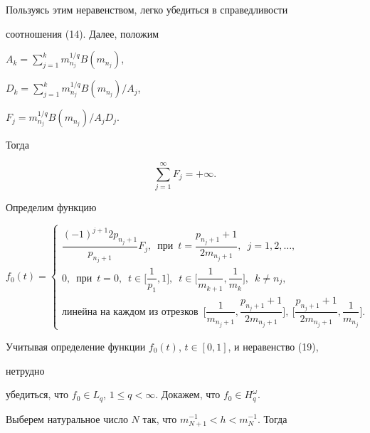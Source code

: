 \begin{pf}
\begin{equation}
\end{equation} 


Пользуясь этим неравенством, легко убедиться в справедливости 


соотношения (14). Далее, положим 


$A_k=\sum\limits^k_{j=1}m^{1/q}_{n_j}B(m_{n_j})$, 


$D_k=\sum\limits^k_{j=1}m^{1/q}_{n_j}B(m_{n_j})/A_j$, 


$F_j=m^{1/q}_{n_j}B(m_{n_j})/A_j D_j$. 


Тогда 


\begin{equation} 


\sum^\infty_{j=1}F_j=+\infty. 


\end{equation} 


 


Определим функцию 


$$ 


f_0(t)= 


\begin{cases} 


\dfrac{(-1)^{j+1}2p_{n_j+1}}{p_{n_j+1}}F_j,\ \; \text{при}\ \; 


t=\dfrac{p_{n_j+1}+1}{2m_{n_j+1}},\ \;j=1,2,\dotsc,\\ 


0,\ \; \text{при}\ \; t=0,\ \; t\in\Big[\dfrac{1}{p_1},1\Big], 


\ \; t\in\Big[\dfrac{1}{m_{k+1}},\dfrac{1}{m_k}\Big], 


\ \; k\ne n_j, \\ 


\text{линейна на каждом из отрезков}\ \; 


\Big[\dfrac{1}{m_{n_j+1}},\dfrac{p_{n_j+1}+1}{2m_{n_j+1}}\Big], 


\ \Big[\dfrac{p_{n_j+1}+1}{2m_{n_j+1}},\dfrac{1}{m_{n_j}}\Big]. 


\end{cases} 


$$ 


Учитывая определение функции $f_0(t)$, $t\in[0,1]$, и неравенство (19), 


нетрудно 


убедиться, что $f_0\in L_q$, $1\le q<\infty$. Докажем, что $f_0\in 


H^\omega_q$. 


Выберем натуральное число $N$ так, что $m^{-1}_{N+1}<h<m^{-1}_N$. Тогда 



\end{pf}
